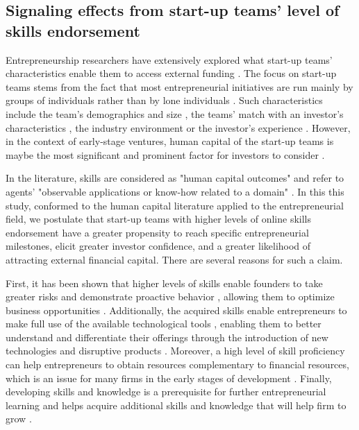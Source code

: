 \documentclass[12pt]{article}
\begin{document}
\subsection{Signaling effects from start-up teams' level of skills endorsement}

Entrepreneurship researchers have extensively explored what start-up teams' characteristics enable them to access external funding \citep{roure1990predictors}. The focus on start-up teams stems from the fact that most entrepreneurial initiatives are run mainly by groups of individuals rather than by lone individuals \citep{klotz2014new}. Such characteristics include the team's demographics and size \citep{eisenhardt1990organizational}, the teams' match with an investor's characteristics \citep{aggarwal2015evaluating}, the industry environment \citep{townsend2015turning} or the investor's experience \citep{franke2008venture}. However, in the context of early-stage ventures, human capital of the start-up teams is maybe the most significant and prominent factor for investors to consider \citep{beckman2007early, ko2018signaling, matusik2008values}.

In the literature, skills are considered as "human capital outcomes" and refer to agents’ "observable applications or know-how related to a domain" \citep{becker1964human, marvel2016human}. In this this study, conformed to the human capital literature applied to the entrepreneurial field, we postulate that start-up teams with higher levels of online skills endorsement have a greater propensity to reach specific entrepreneurial milestones, elicit greater investor confidence, and a greater likelihood of attracting external financial capital. There are several reasons for such a claim.

First, it has been shown that higher levels of skills enable founders to take greater risks and demonstrate proactive behavior \citep{becherer1999proactive}, allowing them to optimize business opportunities \citep{shane2000promise, chandler1994founder}. Additionally, the acquired skills enable entrepreneurs to make full use of the available technological tools \citep{nambisan2017digital}, enabling them to better understand and differentiate their offerings through the introduction of new technologies and disruptive products \citep{marvel2007technology}. Moreover, a high level of skill proficiency can help entrepreneurs to obtain resources complementary to financial resources, which is an issue for many firms in the early stages of development \citep{beckman2007early}. Finally, developing skills and knowledge is a prerequisite for further entrepreneurial learning and helps acquire additional skills and knowledge that will help firm to grow \citep{hunter1986cognitive}.
\end{document}
